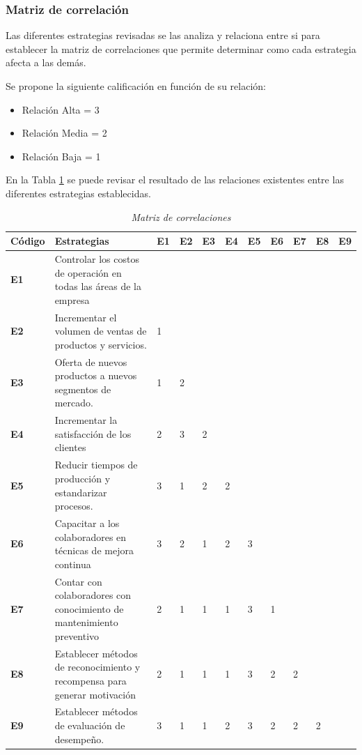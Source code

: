 \documentclass[12pt, a4paper]{article}
\begin{document}
\subsubsection{Matriz de correlación}

Las diferentes estrategias revisadas se las analiza y relaciona entre si para establecer la matriz de correlaciones que permite determinar como cada estrategia afecta a las demás.

Se propone la siguiente calificación en función de su relación: 


\begin{itemize}	
	\item Relación Alta 	= 	3
	\item Relación Media 	= 	2
	\item Relación Baja 	= 	1
\end{itemize}

En la Tabla \ref{tabla:2} se puede revisar el resultado de las relaciones existentes entre las diferentes estrategias establecidas.\\


\begin{table}[H]
\centering
\caption{\textit{Matriz de correlaciones}}
\label{tabla:2}
\begin{tabular}{|p{1.4cm}|p{6cm}|p{0.4cm}|p{0.4cm}|p{0.4cm}|p{0.4cm}|p{0.4cm}|p{0.4cm}|p{0.4cm}|p{0.4cm}|p{0.4cm}|}
\hline
\textbf{Código} & \textbf{Estrategias} & \textbf{E1} & \textbf{E2} & \textbf{E3} & \textbf{E4} & \textbf{E5} & \textbf{E6} & \textbf{E7} & \textbf{E8} & \textbf{E9} \\ \hline
\textbf{E1} & Controlar los costos de operación en todas las áreas de la empresa &  &  &  &  &  &  &  &  &  \\ \hline
\textbf{E2} & Incrementar el volumen de ventas de productos y servicios. & 1 &  &  &  &  &  &  &  &  \\ \hline
\textbf{E3} & Oferta de nuevos productos a nuevos segmentos de mercado. & 1 & 2 &  &  &  &  &  &  &  \\ \hline
\textbf{E4} & Incrementar la satisfacción de los clientes & 2 & 3 & 2 &  &  &  &  &  &  \\ \hline
\textbf{E5} & Reducir tiempos de producción y estandarizar procesos. & 3 & 1 & 2 & 2 &  &  &  &  &  \\ \hline
\textbf{E6} & Capacitar a los colaboradores en técnicas de mejora continua & 3 & 2 & 1 & 2 & 3 &  &  &  &  \\ \hline
\textbf{E7} & Contar con colaboradores con conocimiento de mantenimiento preventivo & 2 & 1 & 1 & 1 & 3 & 1 &  &  &  \\ \hline
\textbf{E8} & Establecer métodos de reconocimiento y recompensa para generar motivación & 2 & 1 & 1 & 1 & 3 & 2 & 2 &  &  \\ \hline
\textbf{E9} & Establecer métodos de evaluación de desempeño. & 3 & 1 & 1 & 2 & 3 & 2 & 2 & 2 &  \\ \hline
\end{tabular}
\end{table}
\end{document}
